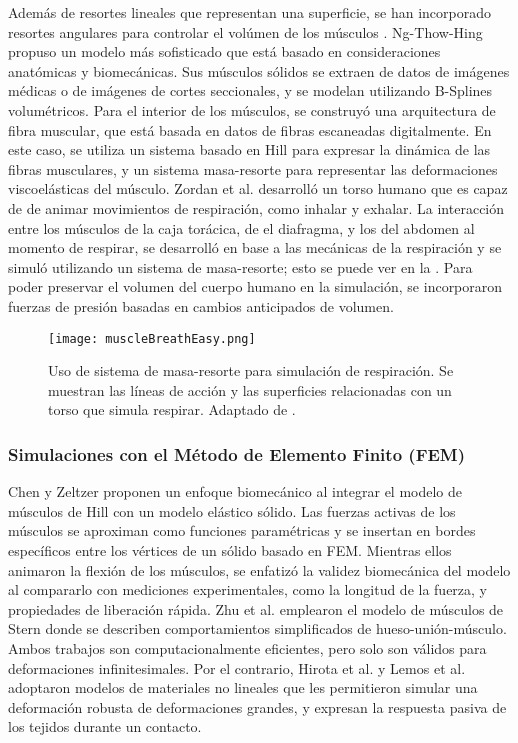 Además de resortes lineales que representan una superficie, se han incorporado resortes angulares para controlar el volúmen de los músculos \citep{nedel1998real}. Ng-Thow-Hing \citep{ng2001anatomically} propuso un modelo más sofisticado que está basado en consideraciones anatómicas y biomecánicas. Sus músculos sólidos se extraen de datos de imágenes médicas o de imágenes de cortes seccionales, y se modelan utilizando B-Splines volumétricos. Para el interior de los músculos, se construyó una arquitectura de fibra muscular, que está basada en datos de fibras escaneadas digitalmente. En este caso, se utiliza un sistema basado en Hill \citep{hill1970first} para expresar la dinámica de las fibras musculares, y un sistema masa-resorte para representar las deformaciones viscoelásticas del músculo. Zordan et al. \citep{zordan2004breathe} desarrolló un torso humano que es capaz de de animar movimientos de respiración, como inhalar y exhalar. La interacción entre los músculos de la caja torácica, de el diafragma, y los del abdomen al momento de respirar, se desarrolló en base a las mecánicas de la respiración y se simuló utilizando un sistema de masa-resorte; esto se puede ver en la . Para poder preservar el volumen del cuerpo humano en la simulación, se incorporaron fuerzas de presión basadas en cambios anticipados de volumen.

\begin{figure}
	\centering
		\texttt{[image: muscleBreathEasy.png]}
	\caption[Uso de sistema de masa-resorte para simulación de respiración.]{Uso de sistema de masa-resorte para simulación de respiración. Se muestran las líneas de acción y las superficies relacionadas con un torso que simula respirar. Adaptado de \citep{zordan2004breathe}.}
		\label{fig:muscleBreathEasy}
\end{figure}

\subsubsection{Simulaciones con el Método de Elemento Finito (FEM)}

Chen y Zeltzer \citep{chen1992pump} proponen un enfoque biomecánico al integrar el modelo de músculos de Hill con un modelo elástico sólido. Las fuerzas activas de los músculos se aproximan como funciones paramétricas y se insertan en bordes específicos entre los vértices de un sólido basado en FEM. Mientras ellos animaron la flexión de los músculos, se enfatizó la validez biomecánica del modelo al compararlo con mediciones experimentales, como la longitud de la fuerza, y propiedades de liberación rápida. Zhu et al. \citep{zhu1998real} emplearon el modelo de músculos de Stern \citep{stern1974computer} donde se describen comportamientos simplificados de hueso-unión-músculo. Ambos trabajos son computacionalmente eficientes, pero solo son válidos para deformaciones infinitesimales. Por el contrario, Hirota et al. \citep{hirota2001implicit} y Lemos et al. \citep{lemos2001realistic} adoptaron modelos de materiales no lineales que les permitieron simular una deformación robusta de deformaciones grandes, y expresan la respuesta pasiva de los tejidos durante un contacto. 

